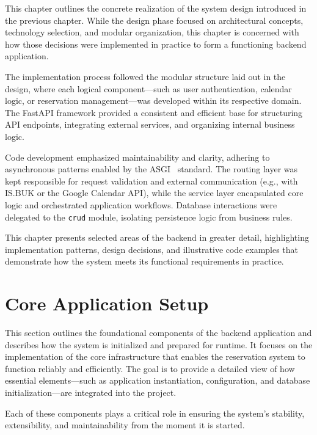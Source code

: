 This chapter outlines the concrete realization of the system design introduced in the previous chapter. While the design phase focused on architectural concepts, technology selection, and modular organization, this chapter is concerned with how those decisions were implemented in practice to form a functioning backend application.

The implementation process followed the modular structure laid out in the design, where each logical component—such as user authentication, calendar logic, or reservation management—was developed within its respective domain. The FastAPI framework provided a consistent and efficient base for structuring API endpoints, integrating external services, and organizing internal business logic.

Code development emphasized maintainability and clarity, adhering to asynchronous patterns enabled by the ASGI~\cite{ASGI} standard. The routing layer was kept responsible for request validation and external communication (e.g., with IS.BUK or the Google Calendar API), while the service layer encapsulated core logic and orchestrated application workflows. Database interactions were delegated to the \texttt{crud} module, isolating persistence logic from business rules.

This chapter presents selected areas of the backend in greater detail, highlighting implementation patterns, design decisions, and illustrative code examples that demonstrate how the system meets its functional requirements in practice.

\section{Core Application Setup}

This section outlines the foundational components of the backend application and describes how the system is initialized and prepared for runtime. It focuses on the implementation of the core infrastructure that enables the reservation system to function reliably and efficiently. The goal is to provide a detailed view of how essential elements—such as application instantiation, configuration, and database initialization—are integrated into the project.

Each of these components plays a critical role in ensuring the system's stability, extensibility, and maintainability from the moment it is started.


